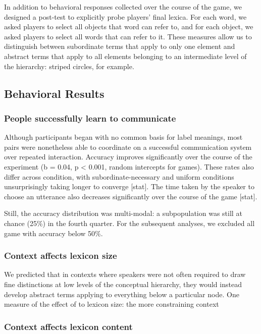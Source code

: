 \documentclass[10pt,letterpaper]{article}
\begin{document}
In addition to behavioral responses collected over the course of the game, we designed a post-test to explicitly probe players' final lexica. For each word, we asked players to select all objects that word can refer to, and for each object, we asked players to select all words that can refer to it. These measures allow us to distinguish between subordinate terms that apply to only one element and abstract terms that apply to all elements belonging to an intermediate level of the hierarchy: striped circles, for example.

\subsection{Behavioral Results}

\subsubsection{People successfully learn to communicate}

Although participants began with no common basis for label meanings, most pairs were nonetheless able to coordinate on a successful communication system over repeated interaction. Accuracy improves significantly over the course of the experiment (b = 0.04, p < 0.001, random intercepts for games). These rates also differ across condition, with subordinate-necessary and uniform conditions unsurprisingly taking longer to converge [stat]. The time taken by the speaker to choose an utterance also decreases significantly over the course of the game [stat].

Still, the accuracy distribution was multi-modal: a subpopulation was still at chance (25\%) in the fourth quarter. For the subsequent analyses, we excluded all game with accuracy below 50\%.

\subsubsection{Context affects lexicon size}

We predicted that in contexts where speakers were not often required to draw fine distinctions at low levels of the conceptual hierarchy, they would instead develop abstract terms applying to everything below a particular node. One measure of the effect of to lexicon size: the more constraining context

\subsubsection{Context affects lexicon content}
\end{document}
